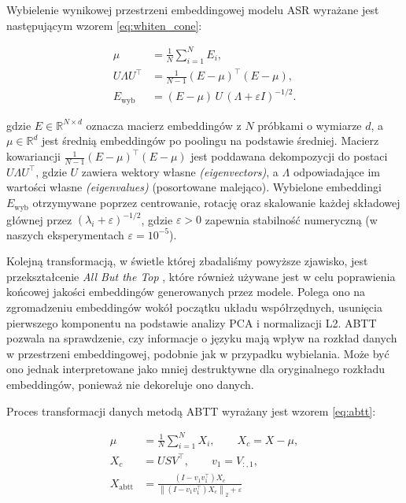 Wybielenie wynikowej przestrzeni embeddingowej modelu ASR wyrażane jest następującym wzorem \ref{eq:whiten_cone}:

\begin{equation}
    \label{eq:whiten_cone}
\begin{aligned}
\mu &= \frac{1}{N}\sum_{i=1}^{N} E_i, \\
U\Lambda U^\top &= \frac{1}{N-1}(E-\mu)^\top(E-\mu), \\
E_{\mathrm{wyb}} &= (E-\mu)\,U\,(\Lambda+\varepsilon I)^{-1/2}.
\end{aligned}
\end{equation}

gdzie $E \in \mathbb{R}^{N \times d}$ oznacza macierz embeddingów z $N$ próbkami o wymiarze $d$, a $\mu \in \mathbb{R}^{d}$ jest średnią embeddingów po poolingu na podstawie średniej. Macierz kowariancji $\frac{1}{N-1}(E-\mu)^\top(E-\mu)$ jest poddawana dekompozycji do postaci $U \Lambda U^\top$, gdzie $U$ zawiera wektory własne \textit{(eigenvectors)}, a $\Lambda$ odpowiadające im wartości własne \textit{(eigenvalues)} (posortowane malejąco). Wybielone embeddingi $E_{\mathrm{wyb}}$ otrzymywane poprzez centrowanie, rotację oraz skalowanie każdej składowej głównej przez $(\lambda_i + \varepsilon)^{-1/2}$, gdzie $\varepsilon > 0$ zapewnia stabilność numeryczną (w naszych eksperymentach $\varepsilon = 10^{-5}$).


Kolejną transformacją, w świetle której zbadaliśmy powyższe zjawisko, jest przekształcenie \textit{All But the Top} \cite{abtt}, które również używane jest w celu poprawienia końcowej jakości embeddingów generowanych przez modele. Polega ono na zgromadzeniu embeddingów wokół początku układu współrzędnych, usunięcia pierwszego komponentu na podstawie analizy PCA i normalizacji L2. ABTT pozwala na sprawdzenie, czy informacje o języku mają wpływ na rozkład danych w przestrzeni embeddingowej, podobnie jak w przypadku wybielania. Może być ono jednak interpretowane jako mniej destruktywne dla oryginalnego rozkładu embeddingów, ponieważ nie dekoreluje ono danych.

Proces transformacji danych metodą ABTT wyrażany jest wzorem \ref{eq:abtt}:

\begin{equation}
\label{eq:abtt}
\begin{aligned}
\mu &= \frac{1}{N}\sum_{i=1}^{N} X_i, \qquad
X_c = X - \mu, \\
X_c &= U S V^\top, \qquad
v_1 = V_{:,1}, \\
X_{\mathrm{abtt}} &=
\frac{\left(I - v_1 v_1^\top\right) X_c}
{\left\|\left(I - v_1 v_1^\top\right) X_c\right\|_2 + \varepsilon}
\end{aligned}
\end{equation}

